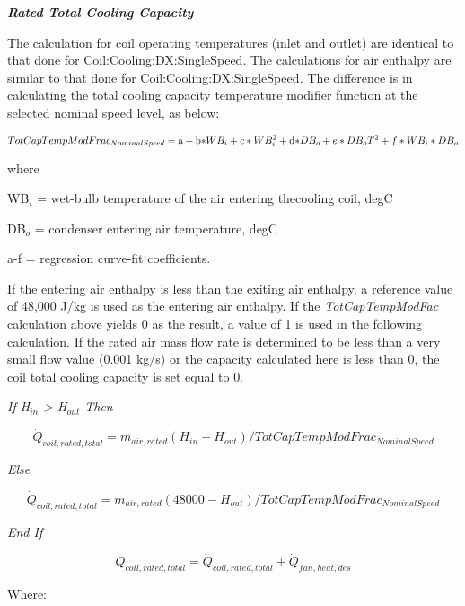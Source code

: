 \textbf{\emph{Rated Total Cooling Capacity}}

The calculation for coil operating temperatures (inlet and outlet) are identical to that done for Coil:Cooling:DX:SingleSpeed. The calculations for air enthalpy are similar to that done for Coil:Cooling:DX:SingleSpeed\emph{.} The difference is in calculating the total cooling capacity temperature modifier function at the selected nominal speed level, as below:

\begin{equation}
TotCapTempModFra{c_{NominalSpeed}} = {\rm{a}} + {\rm{b*}}W{B_i} + c*WB_i^2 + {\rm{d*}}D{B_o} + e*D{B_o}{T^2} + f*W{B_i}*D{B_o}
\end{equation}

where

WB\(_{i}\) = wet-bulb temperature of the air entering thecooling coil, degC

DB\(_{o}\) = condenser entering air temperature, degC

a-f = regression curve-fit coefficients.

If the entering air enthalpy is less than the exiting air enthalpy, a reference value of 48,000 J/kg is used as the entering air enthalpy. If the \emph{TotCapTempModFac} calculation above yields 0 as the result, a value of 1 is used in the following calculation. If the rated air mass flow rate is determined to be less than a very small flow value (0.001 kg/s) or the capacity calculated here is less than 0, the coil total cooling capacity is set equal to 0.

\emph{If H\(_{in}\) \textgreater{} H\(_{out}\) Then}

\begin{equation}
{\dot Q_{coil,rated,total}} = {m_{air,rated}}({H_{in}} - {H_{out}})/TotCapTempModFra{c_{NominalSpeed}}
\end{equation}

\emph{Else}

\begin{equation}
{\dot Q_{coil,rated,total}} = {m_{air,rated}}(48000 - {H_{out}})/TotCapTempModFra{c_{NominalSpeed}}
\end{equation}

\emph{End If}

\begin{equation}
{\dot Q_{coil,rated,total}} = {\dot Q_{coil,rated,total}} + \dot{Q}_{fan,heat,des}
\end{equation}

Where:

